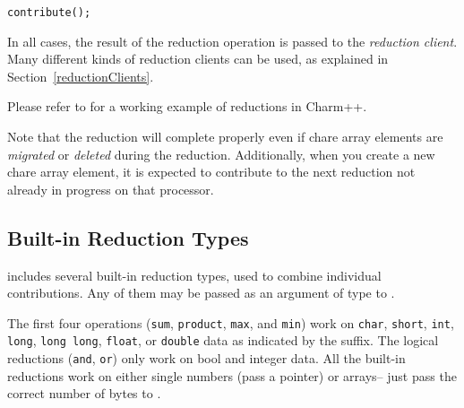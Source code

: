 
\begin{alltt}
    contribute();
\end{alltt}

In all cases, the result of the reduction operation is passed to the {\em reduction
client}.  Many different kinds of reduction clients can be used, as
explained in Section~\ref{reductionClients}.

Please refer to  for a working example of
reductions in Charm++.

Note that the reduction will complete properly even if chare array elements are {\em migrated}
or {\em deleted} during the reduction. Additionally, when you create a new chare array element, 
it is expected to contribute to the next reduction not already in progress on that
processor. 

\subsection{Built-in Reduction Types}
\label{builtin_reduction}

\charmpp{} includes several built-in reduction types, used to combine 
individual contributions.  Any of them may be passed as an argument of type
 to .

The first four operations ({\tt sum}, {\tt product}, {\tt max}, and {\tt min}) work on {\tt char},
{\tt short}, {\tt int}, {\tt long}, {\tt long long}, {\tt float}, or {\tt double} data as indicated
by the suffix.  The logical reductions ({\tt and}, {\tt or}) only work on bool and integer data.
All the built-in reductions work on either single numbers (pass a pointer) or arrays-- just
pass the correct number of bytes to .

